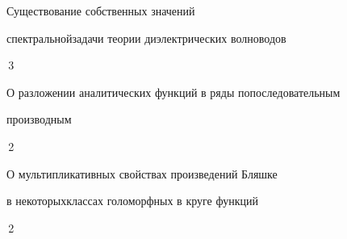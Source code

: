 

{Существование собственных значений 


спектральной\newline задачи теории диэлектрических волноводов}{\No\,3}




{О разложении аналитических функций в ряды по\newline последовательным


производным}{\No\,2}




{О мультипликативных свойствах произведений Бляшке


в некоторых\newline классах голоморфных в круге функций}{\No\,2}








\bigskip





























\bigskip



































